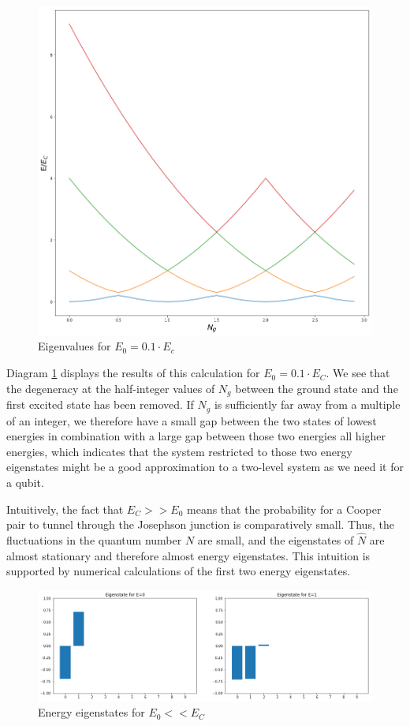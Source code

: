 \documentclass[a4paper, draft]{article}
\theoremstyle{own}
\theoremstyle{remark}
\begin{document}
\begin{figure}[ht]
\centering
\includegraphics[width=0.7\linewidth]{images/CooperPairBoxEnergyLevels_perturbed}
\caption[Eigenvalues for $E_0 = 0.1 \cdot E_c$]{Eigenvalues for $E_0 = 0.1 \cdot E_c$}
\label{fig:CooperPairBoxEnergyLevels_perturbed}
\end{figure}

Diagram \ref{fig:CooperPairBoxEnergyLevels_perturbed} displays the results of this calculation for $E_0 = 0.1 \cdot E_C$. We see that the degeneracy at the half-integer values of $N_g$ between the ground state and the first excited state has been removed. If $N_g$ is sufficiently far away from a multiple of an integer, we therefore have a small gap between the two states of lowest energies in combination with a large gap between those two energies all higher energies, which indicates that the system restricted to those two energy eigenstates might be a good approximation to a two-level system as we need it for a qubit.

Intuitively, the fact that $E_C >> E_0$ means that the probability for a Cooper pair to tunnel through the Josephson junction is comparatively small. Thus, the fluctuations in the quantum number $N$ are small, and the eigenstates of $\hat{N}$ are almost stationary and therefore almost energy eigenstates. This intuition is supported by numerical calculations of the first two energy eigenstates. 

\begin{figure}[ht]
\centering
\includegraphics[width=0.7\linewidth]{images/EnergyEigenstatesChargeRegime}
\caption[Energy eigenstates for $E_0 << E_C$]{Energy eigenstates for $E_0 << E_C$}
\label{fig:EnergyEigenstatesChargeRegime}
\end{figure}
\end{document}
